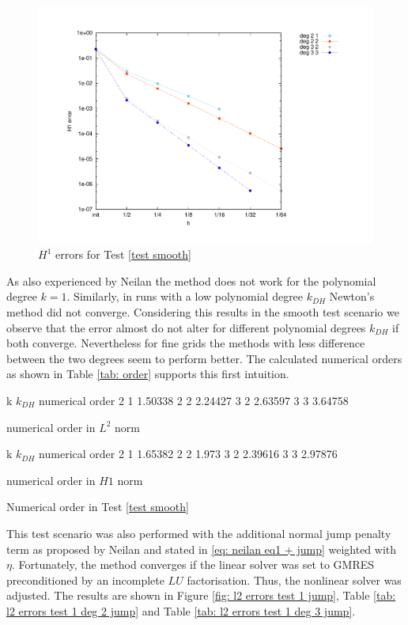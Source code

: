 \begin{figure}[H]
\centering
	\includegraphics[scale =0.45]{plots/MA1_Neilan_h1.pdf}
	\caption{$H^1$ errors for Test \ref{test smooth}}
	\label{fig: h1 errors test 1}
\end{figure}

As also experienced by Neilan the method does not work for the polynomial degree $k=1$. Similarly, in runs with a low polynomial degree $k_{DH}$ Newton's method did not converge.
Considering this results in the smooth test scenario we observe that the error almost do not alter for different polynomial degrees $k_{DH}$ if both converge. Nevertheless for fine grids the methods with less difference between the two degrees seem to perform better. The calculated numerical orders as shown in Table \ref{tab: order} supports this first intuition.

\begin{table}[H]
\begin{subtable}[b]{0.45\textwidth}
\centering
	\pgfplotstabletypeset
	{
		k $k_{DH}$ {numerical order}
		2 1  1.50338
		2 2  2.24427
		3 2 2.63597
		3 3 3.64758
	}
	\caption{numerical order in $L^2$ norm}
\end{subtable}
\begin{subtable}[b]{0.45\textwidth}
	\pgfplotstabletypeset
	{
		k $k_{DH}$ {numerical order}
		2 1  1.65382 
		2 2  1.973
		3 2 2.39616
		3 3 2.97876
	}
	\caption{numerical order in $H1$ norm}
	\end{subtable}
\caption{Numerical order in Test \ref{test smooth}}
\label{tab: order}
\end{table}

This test scenario was also performed with the additional normal jump penalty term as proposed by Neilan and stated in \eqref{eq: neilan eq1 + jump} weighted with $\eta$. Fortunately, the method converges if the linear solver was set to GMRES preconditioned by an incomplete $LU$ factorisation. Thus, the nonlinear solver was adjusted. The results are shown in Figure \ref{fig: l2 errors test 1 jump}, Table \ref{tab: l2 errors test 1 deg 2 jump} and Table \ref{tab: l2 errors test 1 deg 3 jump}. 


